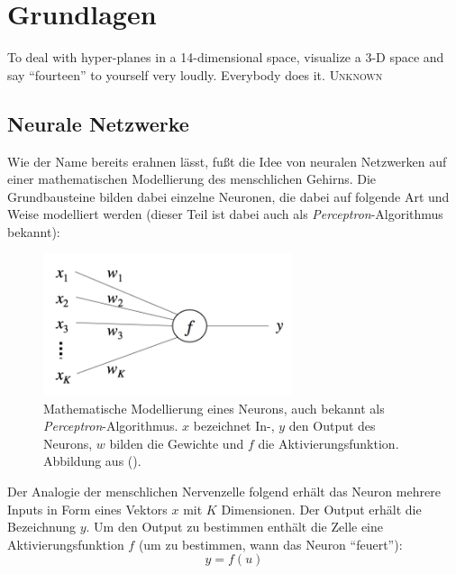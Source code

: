 
\chapter{Grundlagen} %

\label{Chapter3} %


\begin{itquote}
To deal with hyper-planes in a 14-dimensional space, visualize a 3-D space and say ``fourteen'' to yourself
very loudly. Everybody does it.
\flushright
\textsc{Unknown}
\end{itquote}

\section{Neurale Netzwerke}

Wie der Name bereits erahnen lässt, fußt die Idee von neuralen Netzwerken auf einer mathematischen Modellierung
des menschlichen Gehirns. Die Grundbausteine bilden dabei einzelne Neuronen, die dabei auf folgende Art und Weise
modelliert werden (dieser Teil ist dabei auch als \emph{Perceptron}-Algorithmus bekannt):

\begin{figure}[h]
  \centering
  \includegraphics[width=0.65\textwidth]{../img/neuron.png}
  \caption[Mathematische Modellierung eines Neurons]{Mathematische Modellierung eines Neurons, auch bekannt als
  \emph{Perceptron}-Algorithmus. $x$ bezeichnet In-, $y$ den Output des Neurons, $w$ bilden die Gewichte und $f$ die
  Aktivierungsfunktion. Abbildung aus (\cite{rong2014word2vec}).}
\end{figure}

Der Analogie der menschlichen Nervenzelle folgend erhält das Neuron mehrere Inputs in Form eines Vektors $x$ mit $K$
Dimensionen. Der Output erhält die Bezeichnung $y$. Um den Output zu bestimmen enthält die Zelle eine Aktivierungsfunktion
$f$ (um zu bestimmen, wann das Neuron ``feuert''):
\begin{equation}
  y = f(u)
\end{equation}

